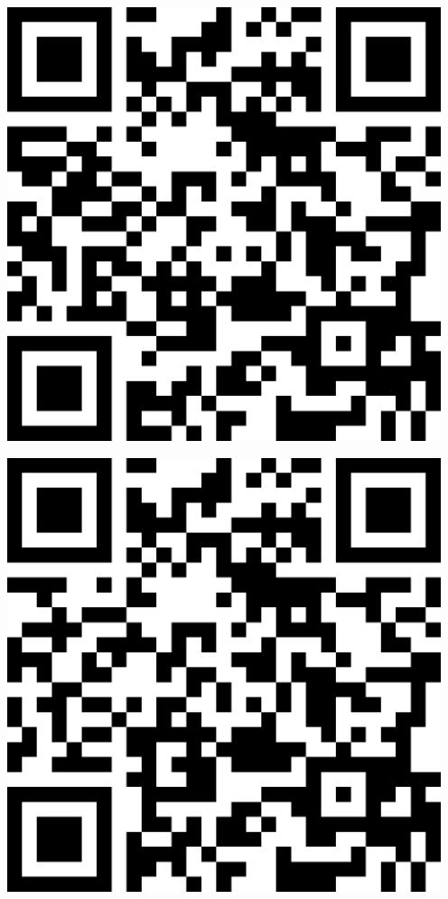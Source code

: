 \documentclass[letterpaper]{article}
\begin{document}
 \endgroup 
 \vspace*{\fill} 
 \pagebreak 
{} 
 \vspace*{\fill} 
 \begingroup 
 \centerline{\includegraphics[scale=1,width=5in,height=5in]{Room3440.png}} 
 \endgroup 
 \vspace*{\fill} 
 \pagebreak 
{} 
 \vspace*{\fill} 
 \begingroup 
 \centerline{\includegraphics[scale=1,width=5in,height=5in]{Room3441.png}} 
\end{document}
